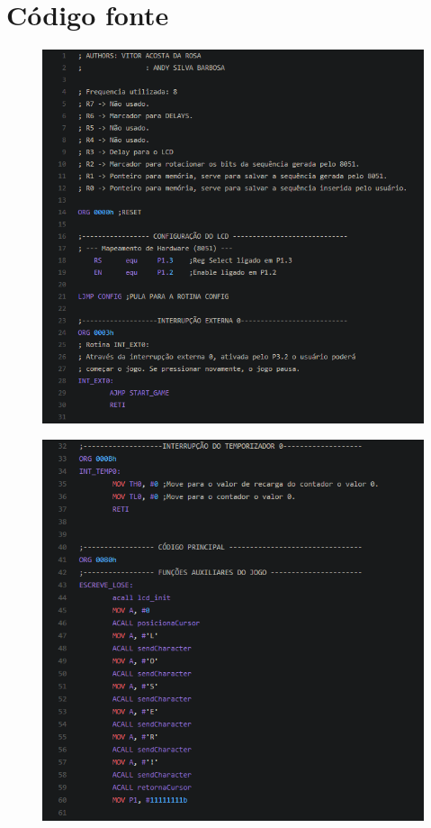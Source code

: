 \documentclass{article}
\begin{document}
\section{Código fonte}
\begin{figure}[H]
\hspace*{-1.0in}
\includegraphics[scale=1]{1.png}
\end{figure}
\begin{figure}[H]
\hspace*{-1.0in}
\includegraphics[scale=1]{2.PNG}
\end{figure}
\end{document}
